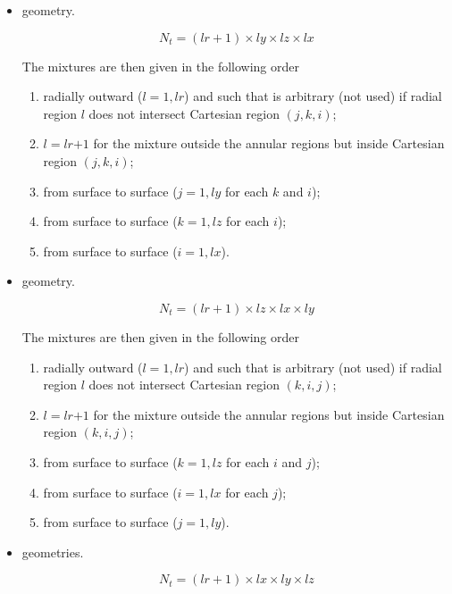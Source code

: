 \begin{itemize}
\item {} geometry.

$$N_{t}=(\textit{lr}+1)\times\textit{ly}\times \textit{lz}\times \textit{lx} $$

The mixtures are then given in the following order
\begin{enumerate}
\item radially outward ($l=1,\textit{lr}$) and such that  is arbitrary (not used) if radial region $l$ does not intersect Cartesian region $(j,k,i)$;
\item $l=\textit{lr+1}$ for the mixture outside the annular regions but inside Cartesian region $(j,k,i)$;
\item from surface  to surface  ($j=1,\textit{ly}$ for each $k$ and $i$);
\item from surface  to surface  ($k=1,\textit{lz}$ for each $i$);
\item from surface  to surface  ($i=1,\textit{lx}$).
\end{enumerate}

\item {} geometry.

$$N_{t}=(\textit{lr}+1)\times\textit{lz}\times \textit{lx}\times \textit{ly}$$

The mixtures are then given in the following order
\begin{enumerate}
\item radially outward ($l=1,\textit{lr}$) and such that  is arbitrary (not used) if radial region $l$ does not intersect Cartesian region $(k,i,j)$;
\item $l=\textit{lr+1}$ for the mixture outside the annular regions but inside Cartesian region $(k,i,j)$;
\item from surface  to surface  ($k=1,\textit{lz}$ for each $i$ and $j$);
\item from surface  to surface  ($i=1,\textit{lx}$ for each $j$);
\item from surface  to surface  ($j=1,\textit{ly}$).
\end{enumerate}

\item {} geometries.

$$N_{t}=(\textit{lr}+1)\times\textit{lx}\times \textit{ly}\times \textit{lz}$$


\end{itemize}
